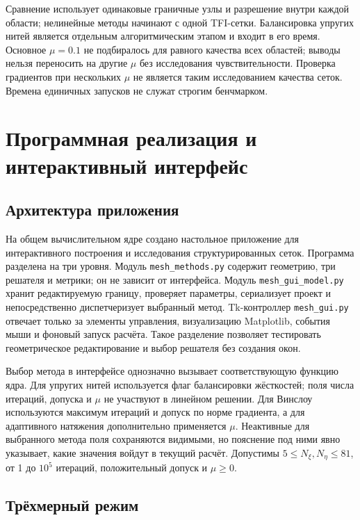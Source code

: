 \documentclass[11pt,a4paper]{article}
\begin{document}
Сравнение использует одинаковые граничные узлы и разрешение внутри
каждой области; нелинейные методы начинают с одной TFI-сетки. Балансировка
упругих нитей является отдельным алгоритмическим этапом и входит в его
время. Основное $\mu=0.1$ не подбиралось для равного качества всех областей;
выводы нельзя переносить на другие $\mu$ без исследования чувствительности.
Проверка градиентов при нескольких $\mu$ не является таким исследованием
качества сеток. Времена единичных запусков не служат строгим бенчмарком.

\FloatBarrier
\section{Программная реализация и интерактивный интерфейс}

\subsection{Архитектура приложения}

На общем вычислительном ядре создано настольное приложение для
интерактивного построения и исследования структурированных сеток.
Программа разделена на три уровня. Модуль \texttt{mesh\_methods.py}
содержит геометрию, три решателя и метрики; он не зависит от
интерфейса. Модуль \texttt{mesh\_gui\_model.py} хранит редактируемую
границу, проверяет параметры, сериализует проект и непосредственно
диспетчеризует выбранный метод. Tk-контроллер
\texttt{mesh\_gui.py} отвечает только за элементы управления,
визуализацию Matplotlib, события мыши и фоновый запуск расчёта. Такое
разделение позволяет тестировать геометрическое редактирование и выбор
решателя без создания окон.

Выбор метода в интерфейсе однозначно вызывает соответствующую функцию
ядра. Для упругих нитей используется флаг балансировки жёсткостей; поля
числа итераций, допуска и \(\mu\) не участвуют в линейном решении. Для
Винслоу используются максимум итераций и допуск по норме градиента, а
для адаптивного натяжения дополнительно применяется \(\mu\). Неактивные
для выбранного метода поля сохраняются видимыми, но пояснение под ними
явно указывает, какие значения войдут в текущий расчёт. Допустимы
\(5\le N_\xi,N_\eta\le81\), от 1 до \(10^5\) итераций, положительный
допуск и \(\mu\ge0\).

\subsection{Трёхмерный режим}
\end{document}
